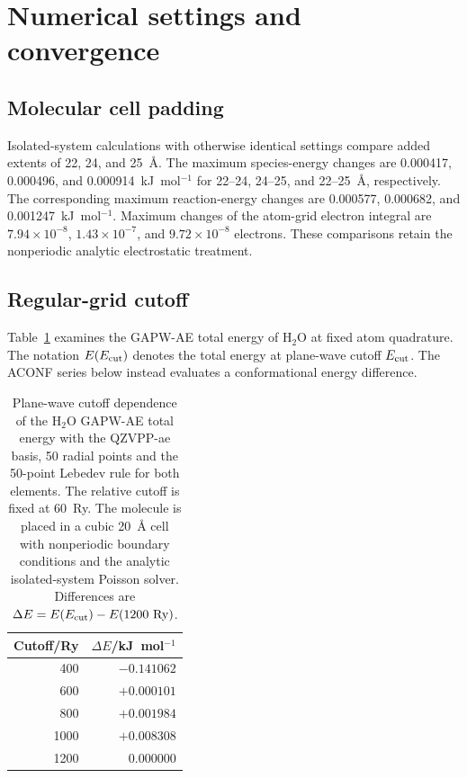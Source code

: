 \documentclass[10pt,a4paper]{article}
\begin{document}
\section{Numerical settings and convergence}
\label{sec:molecular-settings}

\subsection{Molecular cell padding}
\label{sec:padding}

Isolated-system calculations with otherwise identical settings compare added extents of 22, 24, and 25~\AA{}. The maximum species-energy changes are 0.000417, 0.000496, and 0.000914~kJ~mol$^{-1}$ for 22--24, 24--25, and 22--25~\AA{}, respectively. The corresponding maximum reaction-energy changes are 0.000577, 0.000682, and 0.001247~kJ~mol$^{-1}$. Maximum changes of the atom-grid electron integral are $7.94\times10^{-8}$, $1.43\times10^{-7}$, and $9.72\times10^{-8}$ electrons. These comparisons retain the nonperiodic analytic electrostatic treatment.
\FloatBarrier

\subsection{Regular-grid cutoff}
\label{sec:cutoff}


Table~\ref{tab:ae-cutoff} examines the GAPW-AE total energy of H$_2$O at fixed atom quadrature. The notation $E(E_{\rm cut})$ denotes the total energy at plane-wave cutoff $E_{\rm cut}$. The ACONF series below instead evaluates a conformational energy difference.

\begin{table}[htbp]
\centering\small

\caption{Plane-wave cutoff dependence of the H$_2$O GAPW-AE total energy with the QZVPP-ae basis, 50 radial points and the 50-point Lebedev rule for both elements. The relative cutoff is fixed at 60~Ry. The molecule is placed in a cubic 20~\AA{} cell with nonperiodic boundary conditions and the analytic isolated-system Poisson solver. Differences are $\Delta E=E(E_{\rm cut})-E(1200~\mathrm{Ry})$.}
\label{tab:ae-cutoff}
\begin{tabular}{rr}
\toprule
Cutoff/Ry & $\Delta E$/kJ~mol$^{-1}$\\
\midrule
400 & $-0.141062$ \\
600 & $+0.000101$ \\
800 & $+0.001984$ \\
1000 & $+0.008308$ \\
1200 & $0.000000$ \\
\bottomrule
\end{tabular}
\end{table}
\end{document}
